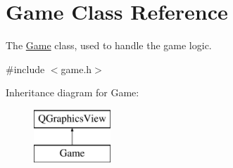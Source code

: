 \hypertarget{classGame}{}\section{Game Class Reference}
\label{classGame}


The \hyperlink{classGame}{Game} class, used to handle the game logic.  




{\ttfamily \#include $<$game.\+h$>$}

Inheritance diagram for Game\+:\begin{figure}[H]
\begin{center}
\leavevmode
\includegraphics[height=2.000000cm]{classGame}
\end{center}
\end{figure}
